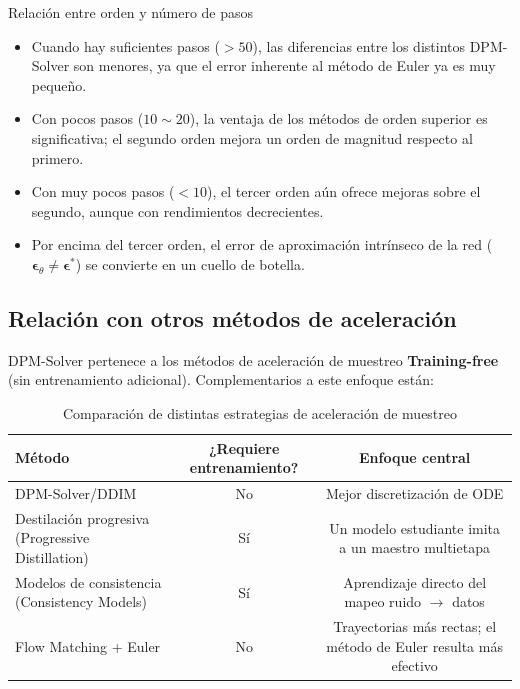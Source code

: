 \begin{knowledgebox}{Relación entre orden y número de pasos}
\begin{itemize}
    \item Cuando hay suficientes pasos ($>50$), las diferencias entre los distintos DPM-Solver son menores, ya que el error inherente al método de Euler ya es muy pequeño.
    \item Con pocos pasos ($10\sim 20$), la ventaja de los métodos de orden superior es significativa; el segundo orden mejora un orden de magnitud respecto al primero.
    \item Con muy pocos pasos ($<10$), el tercer orden aún ofrece mejoras sobre el segundo, aunque con rendimientos decrecientes.
    \item Por encima del tercer orden, el error de aproximación intrínseco de la red ($\boldsymbol{\epsilon}_\theta \neq \boldsymbol{\epsilon}^*$) se convierte en un cuello de botella.
\end{itemize}
\end{knowledgebox}

\subsection{Relación con otros métodos de aceleración}

DPM-Solver pertenece a los métodos de aceleración de muestreo \textbf{Training-free} (sin entrenamiento adicional). Complementarios a este enfoque están:

\begin{table}[H]
\centering
\begin{tabular}{lcc}
\toprule
\textbf{Método} & \textbf{¿Requiere entrenamiento?} & \textbf{Enfoque central} \\
\midrule
DPM-Solver/DDIM & No & Mejor discretización de ODE \\
Destilación progresiva (Progressive Distillation) & Sí & Un modelo estudiante imita a un maestro multietapa \\
Modelos de consistencia (Consistency Models) & Sí & Aprendizaje directo del mapeo ruido $\to$ datos \\
Flow Matching + Euler & No & Trayectorias más rectas; el método de Euler resulta más efectivo \\
\bottomrule
\end{tabular}
\caption{Comparación de distintas estrategias de aceleración de muestreo}
\end{table}

